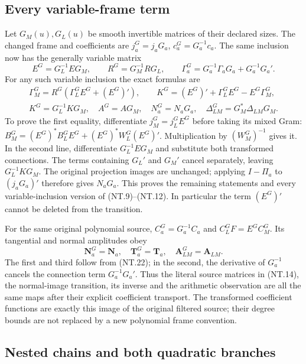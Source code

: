 \subsection{Every variable-frame term}

Let $G_M(u),G_L(u)$ be smooth invertible matrices of their declared
sizes. The changed frame and coefficients are
$j_a^G=j_aG_a$, $c_a^G=G_a^{-1}c_a$.
The same inclusion now has the generally variable matrix
\[
 E^G=G_L^{-1}EG_M,\qquad
 R^G=G_M^{-1}RG_L,\qquad
 \Gamma_a^G=G_a^{-1}\Gamma_aG_a+G_a^{-1}G_a'.
 \tag{NT.21}
\]
For any such variable inclusion the exact formulas are
\[
 \begin{gathered}
 \Gamma_M^G=R^G(\Gamma_L^GE^G+(E^G)'),\qquad
 K^G=(E^G)'+\Gamma_L^GE^G-E^G\Gamma_M^G,\\
 K^G=G_L^{-1}KG_M,\quad
 A^G=AG_M,\quad N_a^G=N_aG_a,\quad
 \Delta_{LM}^G=G_M^*\Delta_{LM}G_M.
 \end{gathered}
 \tag{NT.22}
\]
To prove the first equality, differentiate
$j_M^G=j_L^GE^G$ before taking its mixed Gram:
$B_M^G=(E^G)^*B_L^GE^G+(E^G)^*W_L^G(E^G)'$.
Multiplication by $(W_M^G)^{-1}$ gives it.
In the second line, differentiate $G_L^{-1}EG_M$ and substitute
both transformed connections. The terms containing $G_L'$ and
$G_M'$ cancel separately, leaving $G_L^{-1}KG_M$.
The original projection images are unchanged; applying
$I-\Pi_a$ to $(j_aG_a)'$ therefore gives $N_aG_a$.
This proves the remaining statements and every variable-inclusion
version of (NT.9)--(NT.12). In particular the term $(E^G)'$
cannot be deleted from the transition.

For the same original polynomial source,
$C_a^G=G_a^{-1}C_a$ and
$C_L^GF=E^GC_M^G$. Its tangential and normal amplitudes obey
\[
 \mathbf N_a^G=\mathbf N_a,\quad
 \mathbf T_a^G=\mathbf T_a,\quad
 \mathbf A_{LM}^G=\mathbf A_{LM}.
 \tag{NT.23}
\]
The first and third follow from (NT.22); in the second,
the derivative of $G_a^{-1}$ cancels the connection term
$G_a^{-1}G_a'$. Thus the literal source matrices in (NT.14),
the normal-image transition, its inverse and the arithmetic
observation are all the same maps after their explicit coefficient
transport. The transformed coefficient functions are exactly this
image of the original filtered source; their degree bounds are
not replaced by a new polynomial frame convention.

\subsection{Nested chains and both quadratic branches}

